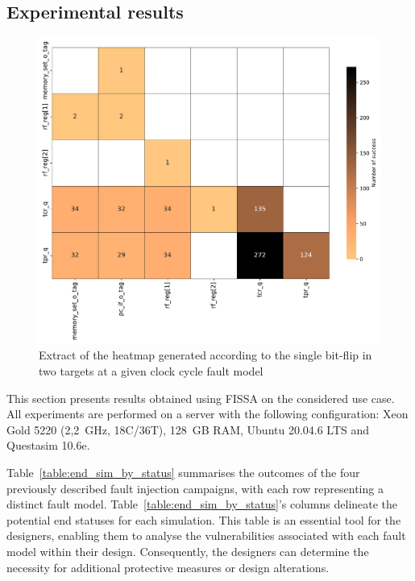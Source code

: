 \subsection{Experimental results} 
\label{subsec:results}

\begin{figure}[t]
    \centering
    \includegraphics[width=.95\textwidth]{c4_fissa/img/heatmap/heatmap_buffer_overflow_wop_1_single_bitflip_spatial_2.pdf}
    \caption{Extract of the heatmap generated according to the single bit-flip in two targets at a given clock cycle fault model}
    \label{fig:heatmap_spatial}
\end{figure}

This section presents results obtained using FISSA on the considered use case.
All experiments are performed on a server with the following configuration: Xeon Gold 5220 (2,2~GHz, 18C/36T), 128~GB RAM, Ubuntu 20.04.6 LTS and Questasim 10.6e.

Table~\ref{table:end_sim_by_status} summarises the outcomes of the four previously described fault injection campaigns, with each row representing a distinct fault model. Table~\ref{table:end_sim_by_status}'s columns delineate the potential end statuses for each simulation. This table is an essential tool for the designers, enabling them to analyse the vulnerabilities associated with each fault model within their design. Consequently, the designers can determine the necessity for additional protective measures or design alterations.

